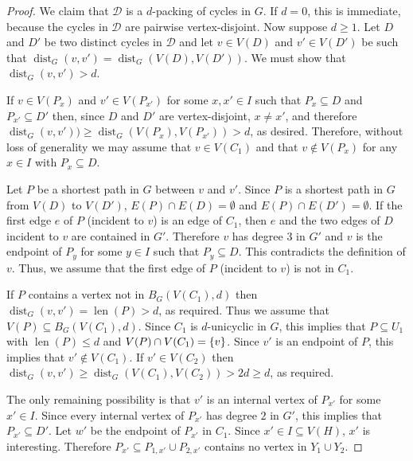 \documentclass{patmorin}
\DeclareMathOperator{\len}{len}
\DeclareMathOperator{\dist}{dist}
\DeclarePairedDelimiter\set{\{}{\}}
\begin{document}
\begin{proof}
    We claim that $\mathcal{D}$ is a $d$-packing of cycles in $G$. If $d=0$, this is immediate, because the cycles in $\mathcal{D}$ are pairwise vertex-disjoint.  Now suppose $d\ge 1$. 
    Let $D$ and $D'$ be two distinct cycles in $\mathcal{D}$ and let $v\in V(D)$ and $v'\in V(D')$ be such that $\dist_G(v,v')=\dist_G(V(D),V(D'))$.  We must show that $\dist_G(v,v')>d$.


    If $v\in V(P_x)$ and $v'\in V(P_{x'})$ for some  $x,x' \in I$ such that $P_x\subseteq D$ and $P_{x'}\subseteq D'$ then,
    since $D$ and $D'$ are vertex-disjoint, $x\neq x'$, and therefore
    $\dist_G(v,v'))\ge  \dist_G(V(P_x),V(P_{x'}))>d$, as desired.  Therefore, without loss of generality we may assume that $v\in V(C_1)$ and that $v\notin V(P_x)$ for any $x\in I$ with $P_x\subseteq D$.

    Let $P$ be a shortest path in $G$ between $v$ and $v'$.  Since $P$ is a shortest path in $G$ from $V(D)$ to $V(D')$, $E(P)\cap E(D)=\emptyset$ and $E(P)\cap E(D')=\emptyset$.  If the first edge $e$ of $P$ (incident to $v$) is an edge of $C_1$, then $e$ and the two edges of $D$ incident to $v$ are contained in $G'$. Therefore $v$ has degree $3$ in $G'$ and $v$ is the endpoint of $P_y$ for some $y\in I$ such that $P_y\subseteq D$.  This contradicts the definition of $v$.
    Thus, we assume that the first edge of $P$ (incident to $v$) is not in $C_1$.

    If $P$ contains a vertex not in $B_G(V(C_1),d)$ then $\dist_G(v,v')=\len(P)>d$, as required.  Thus we assume that $V(P)\subseteq B_G(V(C_1),d)$.
    Since $C_1$ is $d$-unicyclic in $G$, this implies that $P\subseteq U_1$ with $\len(P)\leq d$ and $V(P)\cap V(C_1)=\set{v}$.
    Since $v'$ is an endpoint of $P$, this implies that $v'\notin V(C_1)$.  If $v'\in V(C_2)$ then $\dist_G(v,v')\ge \dist_G(V(C_1),V(C_2))>2d\geq d$, as required.

    The only remaining possibility is that $v'$ is an internal vertex of $P_{x'}$ for some $x'\in I$.  Since every internal vertex of $P_{x'}$ has degree $2$ in $G'$, this implies that  $P_{x'}\subseteq D'$.
    Let $w'$ be the endpoint of $P_{x'}$ in $C_1$. Since $x'\in I\subseteq V(H)$, $x'$ is interesting.
    Therefore $P_{x'}\subseteq P_{1,x'}\cup P_{2,x'}$ contains no vertex in $Y_1\cup Y_2$.


\end{proof}
\end{document}
